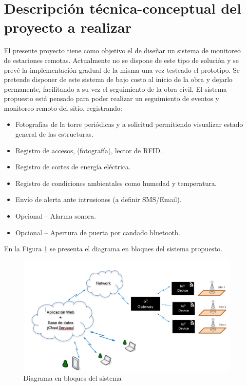 \documentclass[11pt]{charter}
\begin{document}
\section{Descripción técnica-conceptual del proyecto a realizar}
\label{sec:descripcion}

\begin{consigna}

El presente proyecto tiene como objetivo el de diseñar un sistema de monitoreo de estaciones remotas. Actualmente no se dispone de este tipo de solución y se prevé la implementación gradual de la misma una vez testeado el prototipo.
Se pretende disponer de este sistema de bajo costo al inicio de la obra y dejarlo permanente, facilitando a su vez el seguimiento de la obra civil.
El sistema propuesto está pensado para poder realizar un seguimiento de eventos y monitoreo remoto del sitio, registrando:
\begin{itemize}
\item Fotografías de la torre periódicas y a solicitud permitiendo visualizar estado general
de las estructuras.
\item Registro de accesos, (fotografía), lector de RFID.
\item Registro de cortes de energía eléctrica.
\item Registro de condiciones ambientales como humedad y temperatura.
\item Envío de alerta ante intrusiones (a definir SMS/Email).
\item Opcional – Alarma sonora.
\item Opcional – Apertura de puerta por candado bluetooth.
\end{itemize}

En la Figura \ref{fig:diagBloques} se presenta el diagrama en bloques del sistema propuesto. 

\vspace{25px}

\begin{figure}[htpb]
\centering 
\includegraphics[width=.7\textwidth]{./Figuras/diagBloques.png}
\caption{Diagrama en bloques del sistema}
\label{fig:diagBloques}
\end{figure}

\vspace{25px}

\end{consigna}
\end{document}
